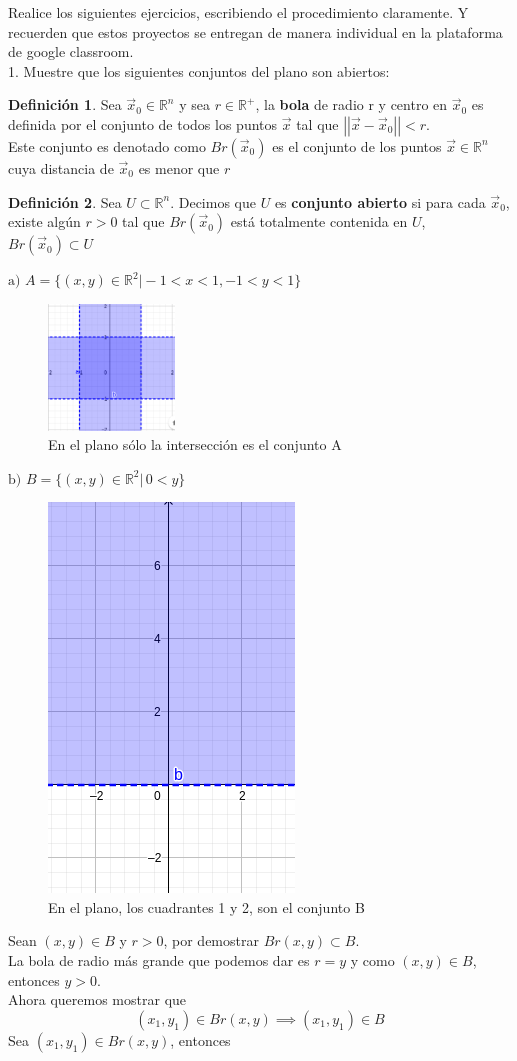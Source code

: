 \documentclass[letterpaper]{article}
\providecommand{\norm}[1]{\left|\left|#1\right|\right|}
\newcommand{\R}{\mathds{R}}
\renewcommand{\*}{\cdot}
\theoremstyle{definition}
\newtheorem{definition}{Definición}
\begin{document}
\noindent Realice los siguientes ejercicios, escribiendo el procedimiento claramente. Y recuerden que estos proyectos se entregan de manera individual en la plataforma de google classroom. \\[0.5cm]
1.  Muestre que los siguientes conjuntos del plano son abiertos: 
\begin{definition}
	Sea $ \vec{x}_0  \in \R^n$  y sea $ r \in \R^+ $, la \textbf{bola} de radio r y centro en $ \vec{x}_0 $ es definida por el conjunto de todos los puntos $ \vec{x} $ tal que $ \norm{\vec{x} - \vec{x}_0} < r $.\\ Este conjunto es denotado como $ Br(\vec{x}_0) $ es el conjunto de los puntos $ \vec{x} \in \R^n $ cuya distancia de $ \vec{x}_0 $ es menor que $ r $
\end{definition}

\begin{definition}
	Sea $ U \subset \R^n $. Decimos que $ U $ es \textbf{conjunto abierto} si para cada $ \vec{x}_0 $, existe algún $ r>0 $ tal que $ Br(\vec{x}_0) $ está totalmente contenida en $ U $, $ Br(\vec{x}_0) \subset U $

\end{definition}

$\text{a) } A = \{ (x,y) \in \mathbb{R}^2 \vert - 1 < x < 1, - 1 < y < 1 \}$
\begin{figure}[h]
	\centering
	\includegraphics[width=0.3\textwidth]{1a}
	\caption{En el plano sólo la intersección es el conjunto A}
\end{figure}

$\text{b) }B = \{ (x,y) \in \mathbb{R}^2 \vert \,  0 < y  \}$
\begin{figure}[h]
	\centering
	\includegraphics[height=0.3\textwidth]{1b}
	\caption{En el plano, los cuadrantes 1 y 2, son el conjunto B}
\end{figure}
Sean $ (x,y) \in B $ y $r >0 $, por demostrar $ Br(x,y) \subset B $.\\
La bola de radio más grande que podemos dar es $ r = y $ y como $ (x,y) \in B $, entonces $ y>0 $.\\
Ahora queremos mostrar que
\[ (x_1,y_1)\in Br(x,y) \implies (x_1,y_1)\in B \]  
Sea $ (x_1, y_1)\in Br(x,y) $, entonces
\end{document}

